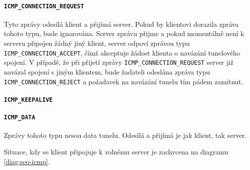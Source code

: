 \documentclass[thesis=M,czech]{FITthesis}[2012/10/20]
\begin{document}
  \paragraph{\texttt{ICMP\_CONNECTION\_REQUEST}}
  
    Tyto zprávy odesílá klient a přijímá server. Pokud by klientovi dorazila zpráva tohoto typu, bude ignorována. Server zprávu přijme a pokud momentálně není k serveru připojen žádný jiný klient, server odpoví zprávou typu \texttt{ICMP\_CONNECTION\_ACCEPT}, čímž akceptuje žádost klienta o navázání tunelového spojení. V případě, že při přijetí zprávy \texttt{ICMP\_CONNECTION\_REQUEST} server již navázal spojení s jiným klientem, bude žadateli odeslána zpráva typu \texttt{ICMP\_CONNECTION\_REJECT} a požadavek na navázání tunelu tím pádem zamítnut.
    
  \paragraph{\texttt{ICMP\_KEEPALIVE}}
  
  
  \paragraph{\texttt{ICMP\_DATA}}
  
    Zprávy tohoto typu nesou data tunelu. Odesílá a přijímá je jak klient, tak server.
    
    
    
    Situace, kdy se klient připojuje k volnému server je zachycena na diagramu \ref{diag:seq-icmp}.
    
\end{document}
